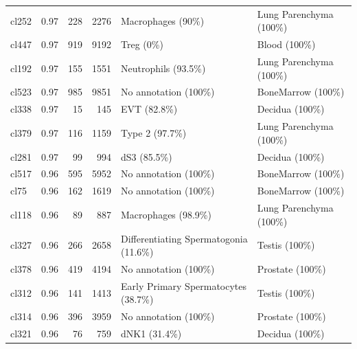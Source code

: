 \begin{table}[ht!]
\begin{tabular}{lrrrll}
  cl252 & 0.97 & 228 & 2276 & Macrophages (90\%) & Lung Parenchyma (100\%) \\ 
  cl447 & 0.97 & 919 & 9192 & Treg (0\%) & Blood (100\%) \\ 
  cl192 & 0.97 & 155 & 1551 & Neutrophils (93.5\%) & Lung Parenchyma (100\%) \\ 
  cl523 & 0.97 & 985 & 9851 & No annotation (100\%) & BoneMarrow (100\%) \\ 
  cl338 & 0.97 &  15 & 145 & EVT (82.8\%) & Decidua (100\%) \\ 
  cl379 & 0.97 & 116 & 1159 & Type 2 (97.7\%) & Lung Parenchyma (100\%) \\ 
  cl281 & 0.97 &  99 & 994 & dS3 (85.5\%) & Decidua (100\%) \\ 
  cl517 & 0.96 & 595 & 5952 & No annotation (100\%) & BoneMarrow (100\%) \\ 
  cl75 & 0.96 & 162 & 1619 & No annotation (100\%) & BoneMarrow (100\%) \\ 
  cl118 & 0.96 &  89 & 887 & Macrophages (98.9\%) & Lung Parenchyma (100\%) \\ 
  cl327 & 0.96 & 266 & 2658 & Differentiating Spermatogonia (11.6\%) & Testis (100\%) \\ 
  cl378 & 0.96 & 419 & 4194 & No annotation (100\%) & Prostate (100\%) \\ 
  cl312 & 0.96 & 141 & 1413 & Early Primary Spermatocytes (38.7\%) & Testis (100\%) \\ 
  cl314 & 0.96 & 396 & 3959 & No annotation (100\%) & Prostate (100\%) \\
  cl321 & 0.96 &  76 & 759 & dNK1 (31.4\%) & Decidua (100\%) \\ 
   \bottomrule
\end{tabular}
\end{table}  
  
